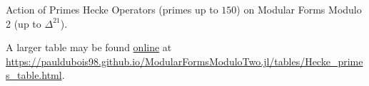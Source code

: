 \begin{center}
\begin{tabular}{|c|ccccccccccc|}
	\hline
\end{tabular}
Action of Primes Hecke Operators (primes up to $150$) on Modular Forms Modulo 2 (up to $\Delta^{21}$).
\end{center}

A larger table may be found \href{https://pauldubois98.github.io/ModularFormsModuloTwo.jl/tables/Hecke_primes_table.html}{online} at \url{https://pauldubois98.github.io/ModularFormsModuloTwo.jl/tables/Hecke_primes_table.html}.



